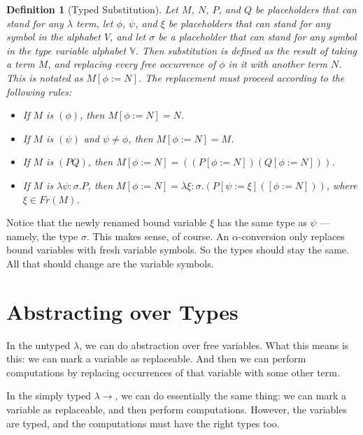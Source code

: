 \documentclass{book}
\numberwithin{equation}{chapter}
\newtheorem{definition}{Definition}
\begin{document}
\begin{definition}[Typed Substitution]
Let $M$, $N$, $P$, and $Q$ be placeholders that can stand for any $\lambda$ term, let $\phi$, $\psi$, and $\xi$ be placeholders that can stand for any symbol in the alphabet $V$, and let $\sigma$ be a placeholder that can stand for any symbol in the type variable alphabet $\mathbb{V}$. Then substitution is defined as the result of taking a term $M$, and replacing every free occurrence of $\phi$ in it with another term $N$. This is notated as $M[\phi := N]$. The replacement must proceed according to the following rules:

\begin{itemize}
\item{If $M$ is $(\phi)$, then $M[\phi := N] = N$.}
\item{If $M$ is $(\psi)$ and $\psi \not = \phi$, then $M[\phi := N] = M$.}
\item{If $M$ is $(PQ)$, then $M[\phi := N] = ((P[\phi := N])(Q[\phi := N]))$.}
\item{If $M$ is $\lambda \psi : \sigma.P$, then $M[\phi := N] = \lambda \xi : \sigma.(P[\psi := \xi]([\phi := N]))$, where $\xi \in Fr(M)$.}
\end{itemize}
\end{definition}

\noindent
Notice that the newly renamed bound variable $\xi$ has the same type as $\psi$ --- namely, the type $\sigma$. This makes sense, of course. An $\alpha$-conversion only replaces bound variables with fresh variable symbols. So the types should stay the same. All that should change are the variable symbols.



\chapter{Abstracting over Types}

In the untyped $\lambda$, we can do abstraction over free variables. What this means is this: we can mark a variable as replaceable. And then we can perform computations by replacing occurrences of that variable with some other term.

In the simply typed $\lambda\rightarrow$, we can do essentially the same thing: we can mark a variable as replaceable, and then perform computations. However, the variables are typed, and the computations must have the right types too.
\end{document}
